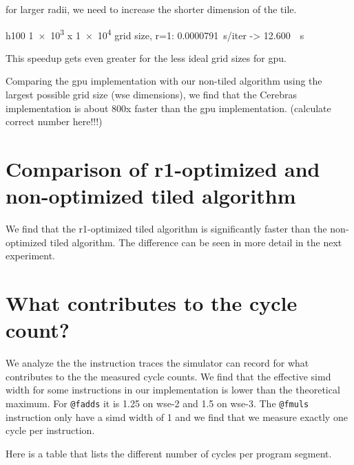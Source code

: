 for larger radii, we need to increase the shorter dimension of the tile.

h100 \num{1e3} x \num{1e4} grid size, r=1: \qty{0.0000791}{\second/iter} -> \qty{12.600}{\per\second}

This speedup gets even greater for the less ideal grid sizes for \ac{gpu}.

Comparing the \ac{gpu} implementation with our non-tiled algorithm using the largest possible grid size (\ac{wse} dimensions), we find that the Cerebras implementation is about 800x faster than the \ac{gpu} implementation. (calculate correct number here!!!)

\section{Comparison of r1-optimized and non-optimized tiled algorithm}
We find that the r1-optimized tiled algorithm is significantly faster than the non-optimized tiled algorithm.
The difference can be seen in more detail in the next experiment.

\section{What contributes to the cycle count?}
We analyze the the instruction traces the simulator can record for what contributes to the the measured cycle counts.
We find that the effective simd width for some instructions in our implementation is lower than the theoretical maximum.
For \texttt{@fadds} it is 1.25 on wse-2 and 1.5 on wse-3.
The \texttt{@fmuls} instruction only have a simd width of 1 and we find that we measure exactly one cycle per instruction.

Here is a table that lists the different number of cycles per program segment. 